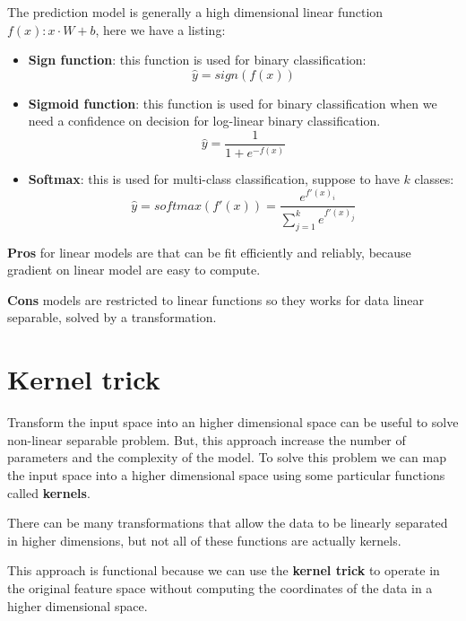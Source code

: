 The prediction model is generally a high dimensional linear function $f(x): x \cdot W + b$,
here we have a listing:
\begin{itemize}
    \item \textbf{Sign function}: this function is used for binary classification:
          \begin{equation}
              \hat{y} = sign(f(x))
          \end{equation}
    \item \textbf{Sigmoid function}: this function is used for binary classification
          when we need a confidence on decision for log-linear binary classification.
          \begin{equation}
              \hat{y} = \frac{1}{1+e^{-f(x)}}
          \end{equation}
    \item \textbf{Softmax}: this is used for multi-class classification, suppose
          to have $k$ classes:
          \begin{equation}
              \hat{y} = softmax(f'(x)) = \frac{e^{f'(x)_i}}{\sum_{j=1}^k e^{f'(x)_j}}
          \end{equation}
\end{itemize}

\textbf{Pros} for linear models are that can be fit efficiently and reliably, because
gradient on linear model are easy to compute.

\textbf{Cons} models are restricted to linear functions so they works for data linear
separable, solved by a transformation.
\section{Kernel trick}
Transform the input space into an higher dimensional space can be useful to solve
non-linear separable problem. But, this approach increase the number of parameters
and the complexity of the model. To solve this problem we can map the input space
into a higher dimensional space using some particular functions called \textbf{kernels}.

\begin{note}
    There can be many transformations that allow the data to be linearly separated
    in higher dimensions, but not all of these functions are actually kernels.
\end{note}

This approach is functional because we can use the \textbf{kernel trick} to operate
in the original feature space without computing the coordinates of the data in a
higher dimensional space.

